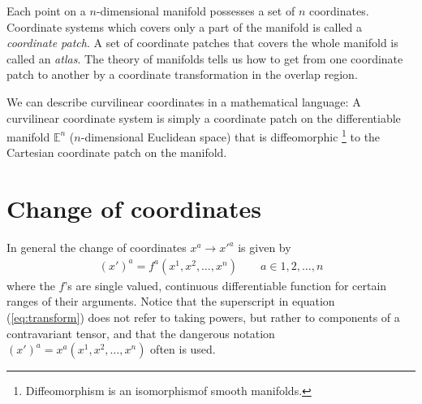 \documentclass[a4paper, 12pt]{article}
\begin{document}
Each point on a $n$-dimensional manifold possesses a set of
$n$ coordinates. Coordinate systems which covers only a part of the manifold is
called a \emph{coordinate patch}. A set of coordinate patches that covers the
whole manifold is called an \emph{atlas}. The theory of manifolds tells us how
to get from one coordinate patch to another by a coordinate transformation in
the overlap region.

We can describe curvilinear coordinates in a mathematical language: A
curvilinear coordinate system is simply a coordinate patch on the differentiable
manifold $\mathbb{E}^n$ ($n$-dimensional Euclidean space) that is diffeomorphic
%
\footnote{Diffeomorphism is an isomorphism\footnotemark of smooth manifolds.}%
%
%
%
%
to the Cartesian coordinate patch on the manifold.







\section{Change of coordinates} \label{sec:change_of_coordinates}
In general the change of coordinates $x^a \to x'^a$ is given by
%
\begin{align}
 (x')^a = f^a(x^1,x^2,\ldots,x^n)\qquad a\in{1,2,\ldots,n} \label{eq:transform}
\end{align}
%
where the $f$'s are single valued, continuous differentiable function for
certain ranges of their arguments. Notice that the superscript in equation
(\ref{eq:transform}) does not refer to taking powers, but rather to components
of a contravariant tensor, and that the dangerous notation $(x')^a =
x^a(x^1,x^2,\ldots,x^n)$ often is used.
\end{document}
